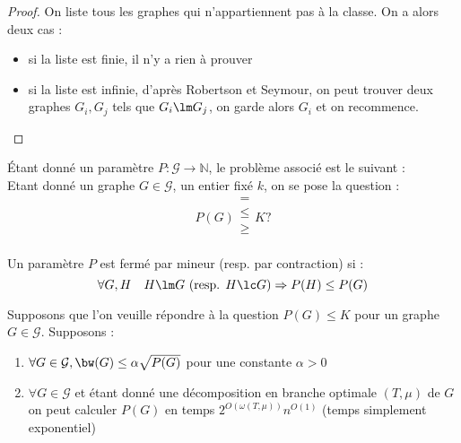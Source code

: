 \documentclass[a4paper, 11pt]{thesis}
\begin{document}
\begin{proof}
    On liste tous les graphes qui n'appartiennent pas à la classe. On a alors deux cas :
    \begin{itemize}
        \item si la liste est finie, il n'y a rien à prouver
        \item si la liste est infinie, d'après Robertson et Seymour, on peut trouver deux graphes
            $G_i, G_j$ tels que $G_i \lm G_j$, on garde alors $G_i$ et on recommence.
    \end{itemize}
\end{proof}

\begin{df}
    Étant donné un paramètre $P : \mathcal{G} \longrightarrow \mathbb{N}$, le problème associé est
    le suivant : \\
    Etant donné un graphe $G \in \mathcal{G}$, un entier fixé $k$, on se pose la question :
    \begin{displaymath}
        P(G) \left . \begin{array}{c}
            = \\ \leq \\ \geq \\
        \end{array}
        \right .
        K ?
    \end{displaymath}
\end{df}

\begin{df}
    Un paramètre $P$ est fermé par mineur (resp. par contraction) si :
    \begin{displaymath}
        \forall G, H \quad H \lm G\ (\mbox{resp. } H \lc G) \Rightarrow P(H) \leq P(G)
    \end{displaymath}
\end{df}



Supposons que l'on veuille répondre à la question $P(G) \leq K$ pour un graphe $G \in \mathcal{G}$.
Supposons :
\begin{enumerate}
    \item $\forall G \in \mathcal{G}, \bw(G) \leq \alpha \sqrt{P(G)}$ pour une constante $\alpha >
        0$
    \item $\forall G \in \mathcal{G}$ et étant donné une décomposition en branche optimale $(T,
        \mu)$ de $G$ on peut calculer $P(G)$ en temps $2^{O(\omega(T,\mu))} n^{O(1)}$ (temps
        simplement exponentiel)
\end{enumerate}
\end{document}
